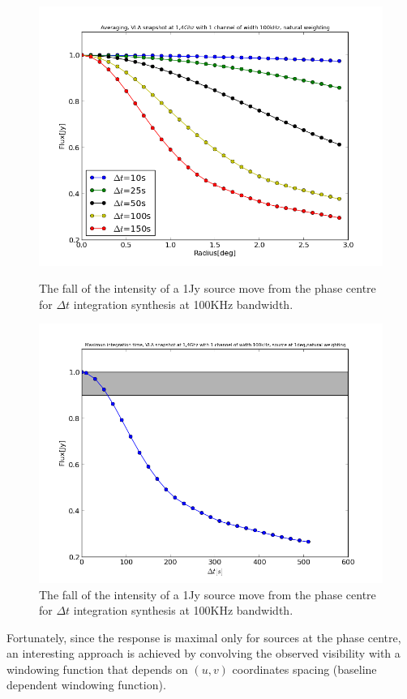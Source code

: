 \documentclass[useAMS,usenatbib]{mn2e}
\begin{document}
\begin{figure}
\begin{minipage}{0.38\linewidth}\includegraphics[width=1\textwidth]{./Figures/effect_time_averaging.png}\caption{The fall of the 
intensity of a 1Jy source move from the phase centre for $\Delta t$ integration synthesis at 100KHz 
bandwidth.}\label{timessear2}\end{minipage}
\begin{minipage}{0.38\linewidth}\includegraphics[width=1\textwidth]{./Figures/maximun_integration.png}\caption{The fall of the 
intensity of a 1Jy source move from the phase centre for $\Delta t$ integration synthesis at 100KHz 
bandwidth.}\label{fig:fig_5}\end{minipage}
\end{figure}
Fortunately, since the response is maximal only for sources at the phase centre, an interesting approach is achieved by convolving the 
observed visibility with a  windowing function that depends on $(u,v)$ coordinates spacing (baseline dependent windowing function).
\end{document}
